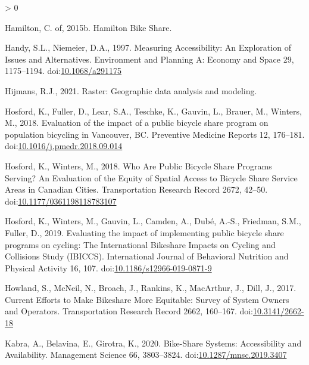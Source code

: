 \documentclass[]{elsarticle} %
\newlength{\cslhangindent}
\newenvironment{CSLReferences}[2] %
 {%
  \setlength{\parindent}{0pt}
  \ifodd #1 \everypar{\setlength{\hangindent}{\cslhangindent}}\ignorespaces\fi
  \ifnum #2 > 0
  \setlength{\parskip}{#2\baselineskip}
  \fi
 }%
 {}
\begin{document}
\begin{CSLReferences}{1}{0}
\leavevmode\hypertarget{ref-hamiltonHamiltonBikeShare2015}{}%
Hamilton, C. of, 2015b. Hamilton {Bike Share}.

\leavevmode\hypertarget{ref-handyMeasuringAccessibilityExploration1997}{}%
Handy, S.L., Niemeier, D.A., 1997. Measuring {Accessibility}: {An
Exploration} of {Issues} and {Alternatives}. Environment and Planning A:
Economy and Space 29, 1175--1194.
doi:\href{https://doi.org/10.1068/a291175}{10.1068/a291175}

\leavevmode\hypertarget{ref-R-raster}{}%
Hijmans, R.J., 2021. Raster: Geographic data analysis and modeling.

\leavevmode\hypertarget{ref-hosfordEvaluationImpactPublic2018}{}%
Hosford, K., Fuller, D., Lear, S.A., Teschke, K., Gauvin, L., Brauer,
M., Winters, M., 2018. Evaluation of the impact of a public bicycle
share program on population bicycling in {Vancouver}, {BC}. Preventive
Medicine Reports 12, 176--181.
doi:\href{https://doi.org/10.1016/j.pmedr.2018.09.014}{10.1016/j.pmedr.2018.09.014}

\leavevmode\hypertarget{ref-hosfordWhoArePublic2018}{}%
Hosford, K., Winters, M., 2018. Who {Are Public Bicycle Share Programs
Serving}? {An Evaluation} of the {Equity} of {Spatial Access} to
{Bicycle Share Service Areas} in {Canadian Cities}. Transportation
Research Record 2672, 42--50.
doi:\href{https://doi.org/10.1177/0361198118783107}{10.1177/0361198118783107}

\leavevmode\hypertarget{ref-hosfordEvaluatingImpactImplementing2019}{}%
Hosford, K., Winters, M., Gauvin, L., Camden, A., Dubé, A.-S., Friedman,
S.M., Fuller, D., 2019. Evaluating the impact of implementing public
bicycle share programs on cycling: The {International Bikeshare Impacts}
on {Cycling} and {Collisions Study} ({IBICCS}). International Journal of
Behavioral Nutrition and Physical Activity 16, 107.
doi:\href{https://doi.org/10.1186/s12966-019-0871-9}{10.1186/s12966-019-0871-9}

\leavevmode\hypertarget{ref-howlandCurrentEffortsMake2017}{}%
Howland, S., McNeil, N., Broach, J., Rankins, K., MacArthur, J., Dill,
J., 2017. Current {Efforts} to {Make Bikeshare More Equitable}: {Survey}
of {System Owners} and {Operators}. Transportation Research Record 2662,
160--167. doi:\href{https://doi.org/10.3141/2662-18}{10.3141/2662-18}

\leavevmode\hypertarget{ref-kabraBikeShareSystemsAccessibility2020}{}%
Kabra, A., Belavina, E., Girotra, K., 2020. Bike-{Share Systems}:
{Accessibility} and {Availability}. Management Science 66, 3803--3824.
doi:\href{https://doi.org/10.1287/mnsc.2019.3407}{10.1287/mnsc.2019.3407}


\end{CSLReferences}
\end{document}

